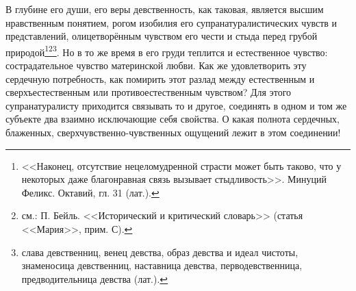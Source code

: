 \documentclass[12pt,oneside]{book}
\begin{document}
В глубине его души, его веры девственность, как таковая, является высшим нравственным понятием, рогом изобилия его супранатуралистических чувств и представлений, олицетворённым чувством его чести и стыда перед грубой природой\dag\let\svthefootnote\thefootnote\let\thefootnote\relax{}\let\thefootnote\svthefootnote\footnote{<<Наконец, отсутствие нецеломудренной страсти может быть таково, что у некоторых даже благонравная связь вызывает стыдливость>>. Минуций Феликс. Октавий, гл. 31 (лат.).}\thinspace\footnote{см.: П. Бейль. <<Исторический и критический словарь>> (статья <<Мария>>, прим. С).}\thinspace\footnote{слава девственниц, венец девства, образ девства и идеал чистоты, знаменосица девственниц, наставница девства, перводевственница, предводительница девства (лат.).}. Но в то же время в его груди теплится и естественное чувство: сострадательное чувство материнской любви. Как же удовлетворить эту сердечную потребность, как помирить этот разлад между естественным и сверхъестественным или противоестественным чувством? Для этого супранатуралисту приходится связывать то и другое, соединять в одном и том же субъекте два взаимно исключающие себя свойства. О какая полнота сердечных, блаженных, сверхчувственно-чувственных ощущений лежит в этом соединении!
\end{document}
